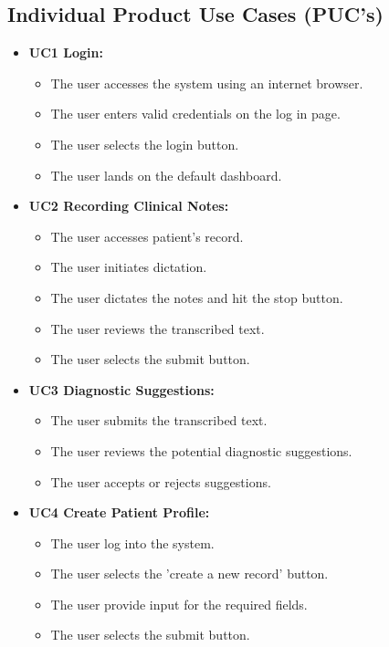 \documentclass[12pt]{article}
\begin{document}
\subsection{Individual Product Use Cases (PUC's)}

\begin{itemize}
  \item\textbf{UC1 Login:}
  \begin{itemize}
    \item The user accesses the system using an internet browser.
    \item The user enters valid credentials on the log in page.
    \item The user selects the login button.
    \item The user lands on the default dashboard.
  \end{itemize}
  \item\textbf{UC2 Recording Clinical Notes:}
  \begin{itemize}
    \item The user accesses patient's record.
    \item The user initiates dictation.
    \item The user dictates the notes and hit the stop button.
    \item The user reviews the transcribed text.
    \item The user selects the submit button.
  \end{itemize}
  \item\textbf{UC3 Diagnostic Suggestions:}
  \begin{itemize}
    \item The user submits the transcribed text.
    \item The user reviews the potential diagnostic suggestions.
    \item The user accepts or rejects suggestions.
  \end{itemize}
  \item\textbf{UC4 Create Patient Profile:}
  \begin{itemize}
    \item The user log into the system.
    \item The user selects the 'create a new record' button.
    \item The user provide input for the required fields.    
    \item The user selects the submit button.
  \end{itemize}
\end{itemize}
\end{document}
